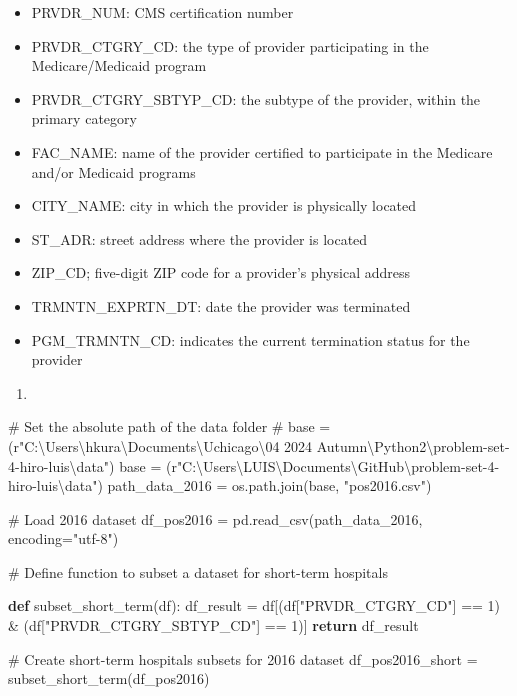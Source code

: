 \documentclass[
  letterpaper,
  DIV=11,
  numbers=noendperiod]{scrartcl}
\newenvironment{Shaded}{\begin{snugshade}}{\end{snugshade}}
\newcommand{\CommentTok}[1]{\textcolor[rgb]{0.37,0.37,0.37}{#1}}
\newcommand{\ControlFlowTok}[1]{\textcolor[rgb]{0.00,0.23,0.31}{\textbf{#1}}}
\newcommand{\DecValTok}[1]{\textcolor[rgb]{0.68,0.00,0.00}{#1}}
\newcommand{\KeywordTok}[1]{\textcolor[rgb]{0.00,0.23,0.31}{\textbf{#1}}}
\newcommand{\NormalTok}[1]{\textcolor[rgb]{0.00,0.23,0.31}{#1}}
\newcommand{\OperatorTok}[1]{\textcolor[rgb]{0.37,0.37,0.37}{#1}}
\newcommand{\StringTok}[1]{\textcolor[rgb]{0.13,0.47,0.30}{#1}}
\newcommand{\VerbatimStringTok}[1]{\textcolor[rgb]{0.13,0.47,0.30}{#1}}
\providecommand{\tightlist}{%
  \setlength{\itemsep}{0pt}\setlength{\parskip}{0pt}}\usepackage{longtable,booktabs,array}
\begin{document}
\begin{itemize}
\item
  PRVDR\_NUM: CMS certification number
\item
  PRVDR\_CTGRY\_CD: the type of provider participating in the
  Medicare/Medicaid program
\item
  PRVDR\_CTGRY\_SBTYP\_CD: the subtype of the provider, within the
  primary category
\item
  FAC\_NAME: name of the provider certified to participate in the
  Medicare and/or Medicaid programs
\item
  CITY\_NAME: city in which the provider is physically located
\item
  ST\_ADR: street address where the provider is located
\item
  ZIP\_CD; five-digit ZIP code for a provider's physical address
\item
  TRMNTN\_EXPRTN\_DT: date the provider was terminated
\item
  PGM\_TRMNTN\_CD: indicates the current termination status for the
  provider
\end{itemize}

\begin{enumerate}
\def\labelenumi{\arabic{enumi}.}
\setcounter{enumi}{1}
\tightlist
\item
\end{enumerate}

\begin{Shaded}
\begin{Highlighting}[]
\CommentTok{\# Set the absolute path of the data folder}
\CommentTok{\# base = (r"C:\textbackslash{}Users\textbackslash{}hkura\textbackslash{}Documents\textbackslash{}Uchicago\textbackslash{}04 2024 Autumn\textbackslash{}Python2\textbackslash{}problem{-}set{-}4{-}hiro{-}luis\textbackslash{}data")}
\NormalTok{base }\OperatorTok{=}\NormalTok{ (}\VerbatimStringTok{r"C:\textbackslash{}Users\textbackslash{}LUIS\textbackslash{}Documents\textbackslash{}GitHub\textbackslash{}problem{-}set{-}4{-}hiro{-}luis\textbackslash{}data"}\NormalTok{)}
\NormalTok{path\_data\_2016 }\OperatorTok{=}\NormalTok{ os.path.join(base, }\StringTok{"pos2016.csv"}\NormalTok{)}

\CommentTok{\# Load 2016 dataset}
\NormalTok{df\_pos2016 }\OperatorTok{=}\NormalTok{ pd.read\_csv(path\_data\_2016, encoding}\OperatorTok{=}\StringTok{"utf{-}8"}\NormalTok{)}

\CommentTok{\# Define function to subset a dataset for short{-}term hospitals}


\KeywordTok{def}\NormalTok{ subset\_short\_term(df):}
\NormalTok{    df\_result }\OperatorTok{=}\NormalTok{ df[(df[}\StringTok{"PRVDR\_CTGRY\_CD"}\NormalTok{] }\OperatorTok{==} \DecValTok{1}\NormalTok{) }\OperatorTok{\&}
\NormalTok{                   (df[}\StringTok{"PRVDR\_CTGRY\_SBTYP\_CD"}\NormalTok{] }\OperatorTok{==} \DecValTok{1}\NormalTok{)]}
    \ControlFlowTok{return}\NormalTok{ df\_result}


\CommentTok{\# Create short{-}term hospitals subsets for 2016 dataset}
\NormalTok{df\_pos2016\_short }\OperatorTok{=}\NormalTok{ subset\_short\_term(df\_pos2016)}
\end{Highlighting}
\end{Shaded}
\end{document}
